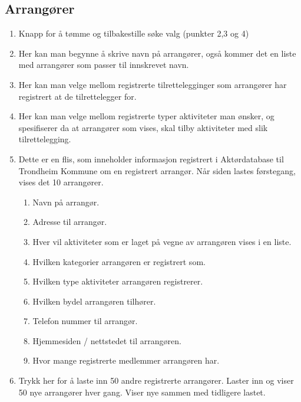 \subsection{Arrangører}
\begin{center}
\end{center}
\begin{enumerate}[nosep]
    \item Knapp for å tømme og tilbakestille søke valg (punkter 2,3 og 4)
    \item Her kan man begynne å skrive navn på arrangører, også kommer det en liste med arrangører som passer til innskrevet navn.
    \item Her kan man velge mellom registrerte tilrettelegginger som arrangører har registrert at de tilrettelegger for.
    \item Her kan man velge mellom registrerte typer aktiviteter man ønsker, og spesifiserer da at arrangører som vises, skal tilby aktiviteter med slik tilrettelegging.
    \item Dette er en flis, som inneholder informasjon registrert i Aktørdatabase til Trondheim Kommune om en registrert arrangør. Når siden lastes førstegang, vises det 10 arrangører.
    \begin{enumerate}
        \item Navn på arrangør.
        \item Adresse til arrangør.
        \item Hver vil aktiviteter som er laget på vegne av arrangøren vises i en liste.
        \item Hvilken kategorier arrangøren er registrert som.
        \item Hvilken type aktiviteter arrangøren registrerer.
        \item Hvilken bydel arrangøren tilhører.
        \item Telefon nummer til arrangør.
        \item Hjemmesiden / nettstedet til arrangøren.
        \item Hvor mange registrerte medlemmer arrangøren har.
    \end{enumerate}
    \item Trykk her for å laste inn 50 andre registrerte arrangører. Laster inn og viser 50 nye arrangører hver gang. Viser nye sammen med tidligere lastet. 
\end{enumerate}

